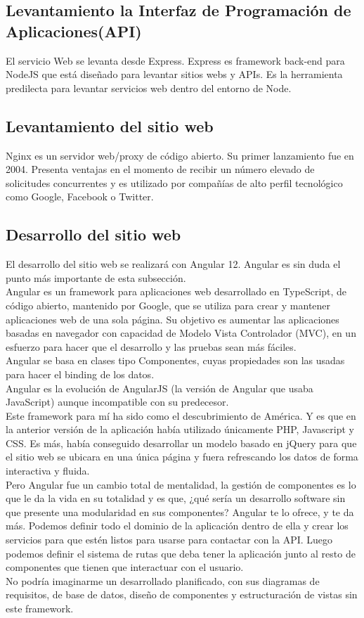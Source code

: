 \subsection{Levantamiento la Interfaz de Programación de Aplicaciones(API)}

El servicio Web se levanta desde Express. Express es framework back-end para NodeJS que está diseñado para levantar sitios webs y APIs. Es la herramienta predilecta para levantar servicios web dentro del entorno de Node.

\subsection{Levantamiento del sitio web}

Nginx es un servidor web/proxy de código abierto. Su primer lanzamiento fue en 2004. Presenta ventajas en el momento de recibir un número elevado de solicitudes concurrentes y es utilizado por compañías de alto perfil tecnológico como Google, Facebook o Twitter.

\subsection{Desarrollo del sitio web}

El desarrollo del sitio web se realizará con Angular 12. Angular es sin duda el punto más importante de esta subsección.
\\Angular es un framework para aplicaciones web desarrollado en TypeScript, de código abierto, mantenido por Google, que se utiliza para crear y mantener aplicaciones web de una sola página. Su objetivo es aumentar las aplicaciones basadas en navegador con capacidad de Modelo Vista Controlador (MVC), en un esfuerzo para hacer que el desarrollo y las pruebas sean más fáciles.
\\Angular se basa en clases tipo Componentes, cuyas propiedades son las usadas para hacer el binding de los datos.
\\Angular es la evolución de AngularJS (la versión de Angular que usaba JavaScript) aunque incompatible con su predecesor.
\\Este framework para mí ha sido como el descubrimiento de América. Y es que en la anterior versión de la aplicación había utilizado únicamente PHP, Javascript y CSS. Es más, había conseguido desarrollar un modelo basado en jQuery para que el sitio web se ubicara en una única página y fuera refrescando los datos de forma interactiva y fluida.
\\Pero Angular fue un cambio total de mentalidad, la gestión de componentes es lo que le da la vida en su totalidad y es que, ¿qué sería un desarrollo software sin que presente una modularidad en sus componentes? Angular te lo ofrece, y te da más. Podemos definir todo el dominio de la aplicación dentro de ella y crear los servicios para que estén listos para usarse para contactar con la API. Luego podemos definir el sistema de rutas que deba tener la aplicación junto al resto de componentes que tienen que interactuar con el usuario.
\\No podría imaginarme un desarrollado planificado, con sus diagramas de requisitos, de base de datos, diseño de componentes y estructuración de vistas sin este framework.

